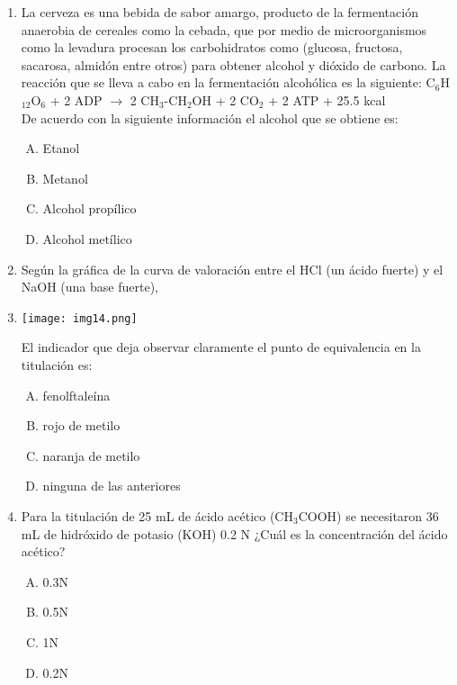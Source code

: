 \begin{enumerate}


\item  La cerveza es una bebida de sabor amargo, producto de la fermentación anaerobia de cereales como la cebada, que por medio de microorganismos como la levadura procesan los carbohidratos como (glucosa, fructosa, sacarosa, almidón entre otros) para obtener alcohol y dióxido de carbono. La reacción que se lleva a cabo en la fermentación alcohólica es la siguiente: C$_6$H$_12$O$_6$ + 2 ADP $\longrightarrow$ 2 CH$_3$-CH$_2$OH + 2 CO$_2$ + 2 ATP + 25.5 kcal \label{jenn-10}\\
De acuerdo con la siguiente información el alcohol que se obtiene es:


\begin{enumerate}[(A)]
\item Etanol
\item Metanol
\item Alcohol propílico
\item Alcohol metílico
\end{enumerate}




\item Según la gráfica de la curva de valoración entre el HCl (un ácido fuerte) y el NaOH (una base fuerte), 
 \label{jenn-11}


\item \texttt{[image: img14.png]}

El indicador que deja observar claramente el punto de equivalencia en la titulación es:

\begin{enumerate}[(A)]
\item   fenolftaleína
\item rojo de metilo
\item naranja de metilo
\item ninguna de las anteriores
\end{enumerate}




\item  Para la titulación de 25 mL de ácido acético (CH$_3$COOH) se necesitaron 36 mL de hidróxido de potasio (KOH) 0.2 N ¿Cuál es la concentración del ácido acético? \label{jenn-12}


\begin{enumerate}[(A)]
\item   0.3N 
\item 0.5N
\item 1N
\item 0.2N
\end{enumerate}



\end{enumerate}
